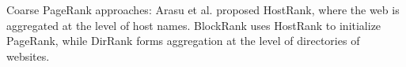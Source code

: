 Coarse PageRank approaches: Arasu et al. \cite{rank-arasu02} proposed HostRank, where the web is aggregated at the level of host names. BlockRank \cite{kamvar2003exploiting} uses HostRank to initialize PageRank, while DirRank \cite{rank-eiron04} forms aggregation at the level of directories of websites.









